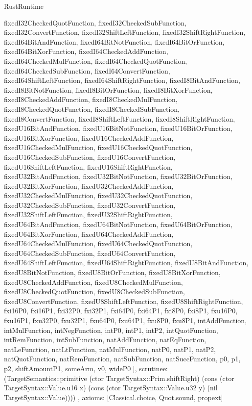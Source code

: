 \begin{lexlean}{RustRuntime}
\begin{semanticmodule}
{{      fixedI32CheckedQuotFunction,
      fixedI32CheckedSubFunction,
      fixedI32ConvertFunction,
      fixedI32ShiftLeftFunction,
      fixedI32ShiftRightFunction,
      fixedI64BitAndFunction,
      fixedI64BitNotFunction,
      fixedI64BitOrFunction,
      fixedI64BitXorFunction,
      fixedI64CheckedAddFunction,
      fixedI64CheckedMulFunction,
      fixedI64CheckedQuotFunction,
      fixedI64CheckedSubFunction,
      fixedI64ConvertFunction,
      fixedI64ShiftLeftFunction,
      fixedI64ShiftRightFunction,
      fixedI8BitAndFunction,
      fixedI8BitNotFunction,
      fixedI8BitOrFunction,
      fixedI8BitXorFunction,
      fixedI8CheckedAddFunction,
      fixedI8CheckedMulFunction,
      fixedI8CheckedQuotFunction,
      fixedI8CheckedSubFunction,
      fixedI8ConvertFunction,
      fixedI8ShiftLeftFunction,
      fixedI8ShiftRightFunction,
      fixedU16BitAndFunction,
      fixedU16BitNotFunction,
      fixedU16BitOrFunction,
      fixedU16BitXorFunction,
      fixedU16CheckedAddFunction,
      fixedU16CheckedMulFunction,
      fixedU16CheckedQuotFunction,
      fixedU16CheckedSubFunction,
      fixedU16ConvertFunction,
      fixedU16ShiftLeftFunction,
      fixedU16ShiftRightFunction,
      fixedU32BitAndFunction,
      fixedU32BitNotFunction,
      fixedU32BitOrFunction,
      fixedU32BitXorFunction,
      fixedU32CheckedAddFunction,
      fixedU32CheckedMulFunction,
      fixedU32CheckedQuotFunction,
      fixedU32CheckedSubFunction,
      fixedU32ConvertFunction,
      fixedU32ShiftLeftFunction,
      fixedU32ShiftRightFunction,
      fixedU64BitAndFunction,
      fixedU64BitNotFunction,
      fixedU64BitOrFunction,
      fixedU64BitXorFunction,
      fixedU64CheckedAddFunction,
      fixedU64CheckedMulFunction,
      fixedU64CheckedQuotFunction,
      fixedU64CheckedSubFunction,
      fixedU64ConvertFunction,
      fixedU64ShiftLeftFunction,
      fixedU64ShiftRightFunction,
      fixedU8BitAndFunction,
      fixedU8BitNotFunction,
      fixedU8BitOrFunction,
      fixedU8BitXorFunction,
      fixedU8CheckedAddFunction,
      fixedU8CheckedMulFunction,
      fixedU8CheckedQuotFunction,
      fixedU8CheckedSubFunction,
      fixedU8ConvertFunction,
      fixedU8ShiftLeftFunction,
      fixedU8ShiftRightFunction,
      fxi16P0,
      fxi16P1,
      fxi32P0,
      fxi32P1,
      fxi64P0,
      fxi64P1,
      fxi8P0,
      fxi8P1,
      fxu16P0,
      fxu16P1,
      fxu32P0,
      fxu32P1,
      fxu64P0,
      fxu64P1,
      fxu8P0,
      fxu8P1,
      intAddFunction,
      intMulFunction,
      intNegFunction,
      intP0,
      intP1,
      intP2,
      intQuotFunction,
      intRemFunction,
      intSubFunction,
      natAddFunction,
      natEqFunction,
      natLeFunction,
      natLtFunction,
      natMulFunction,
      natP0,
      natP1,
      natP2,
      natQuotFunction,
      natRemFunction,
      natSubFunction,
      natSuccFunction,
      p0,
      p1,
      p2,
      shiftAmountP1,
      someArm,
      v0,
      wideP0
    ],
    scrutinee: (TargetSemantics::primitive (ctor TargetSyntax::Prim.shiftRight) (cons (ctor TargetSyntax::Value.u16 x) (cons (ctor TargetSyntax::Value.u32 y) (nil TargetSyntax::Value))))
  },
  axioms: [Classical.choice, Quot.sound, propext]
}


\end{semanticmodule}
\end{lexlean}
